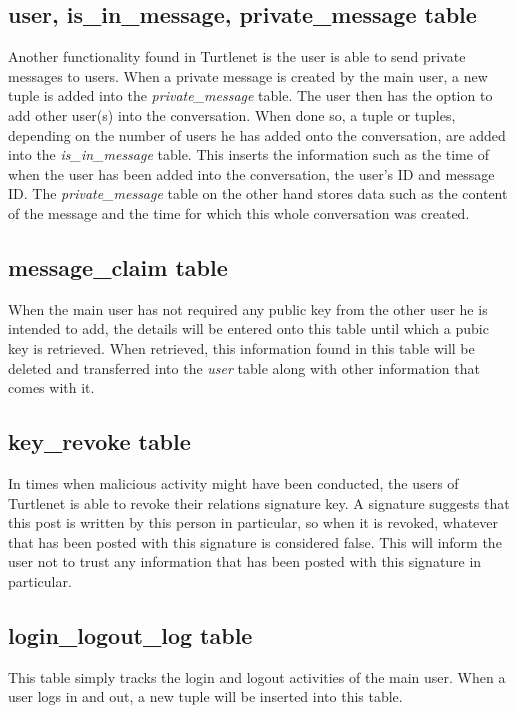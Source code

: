 \subsection{user, is\_in\_message, private\_message table}
Another functionality found in Turtlenet is the user is able to send private messages to users. When a private message is created by the main user, a new tuple is added into the {\it private\_message} table. The user then has the option to add other user(s) into the conversation. When done so, a tuple or tuples, depending on the number of users he has added onto the conversation, are added into the {\it is\_in\_message} table. This inserts the information such as the time of when the user has been added into the conversation, the user's ID and message ID. The {\it private\_message} table on the other hand stores data such as the content of the message and the time for which this whole conversation was created. 

\subsection{message\_claim table}
When the main user has not required any public key from the other user he is intended to add, the details will be entered onto this table until which a pubic key is retrieved. When retrieved, this information found in this table will be deleted and transferred into the {\it user} table along with other information that comes with it.

\subsection{key\_revoke table}
In times when malicious activity might have been conducted, the users of Turtlenet is able to revoke their relations signature key. A signature suggests that this post is written by this person in particular, so when it is revoked, whatever that has been posted with this signature is considered false. This will inform the user not to trust any information that has been posted with this signature in particular. 

\subsection{login\_logout\_log table}
This table simply tracks the login and logout activities of the main user. When a user logs in and out, a new tuple will be inserted into this table.

\clearpage

